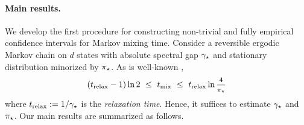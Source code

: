 \paragraph{Main results.}
We develop the first procedure for constructing non-trivial
and fully empirical confidence intervals for Markov mixing time.
Consider a reversible ergodic Markov chain on $d$ states with absolute
spectral gap $\gamma_{\star}$ and stationary distribution minorized by $\pi_{\star}$. 
As is well-known \citep[Theorems~12.3 and~12.4]{LePeWi08},
\begin{equation}
  \label{eq:mixing-time-bound}
  \Parens{\trelax - 1} \ln2
  \ \leq \ \tmix
  \ \leq \ \trelax \ln \mfrac4{\pimin}
\end{equation}
where $t_{\operatorname{relax}} := 1/\gamma_{\star}$ is the \emph{relaxation time}.
Hence, it suffices to estimate $\gamma_{\star}$ and $\pi_{\star}$. 
Our main results are summarized as follows.
